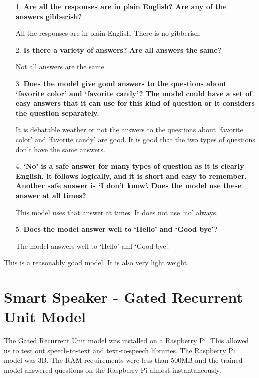 \begin{itemize}
	\item [1.] \textbf{Are all the responses are in plain English? Are any of the answers gibberish?}
	
	\item [] All the responses are in plain English. There is no gibberish.
	
	\item [2.] \textbf{Is there a  variety of answers? Are all answers the same?}
	
	\item [] Not all answers are the same.
	\item [3.] \textbf{Does the model give good answers to the questions about `favorite color' and `favorite candy'? The model could have a set of easy answers that it can use for this kind of question or it considers the question separately.} 
	
	\item[] It is debatable weather or not the answers to the questions about `favorite color' and `favorite candy' are good. It is good that the two types of questions don't have the same answers.
	
	\item [4.] \textbf{`No' is a safe answer for many types of question as it is clearly English, it follows logically, and it is short and easy to remember. Another safe answer is `I don't know'. Does the model use these answer at all times?}
	
	\item[] This model uses that answer at times. It does not use `no' always.
	
	\item [5.] \textbf{Does the model answer well to `Hello' and `Good bye'?}
	
	\item []The model answers well to `Hello' and `Good bye'.
\end{itemize}

This is a reasonably good model. It is also very light weight.

\section{Smart Speaker - Gated Recurrent Unit Model}

The Gated Recurrent Unit model was installed on a Raspberry Pi. This allowed us to test out speech-to-text and text-to-speech libraries. The Raspberry Pi model was 3B. The RAM requirements were less than 500MB and the trained model answered questions on the Raspberry Pi almost instantaneously.

